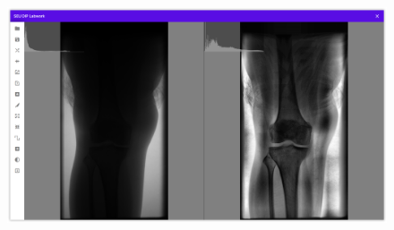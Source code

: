 \documentclass{article}
\begin{document}
\begin{figure}[H]
    \includegraphics[width=\textwidth]{img/knee.png}
\end{figure}
\end{document}
